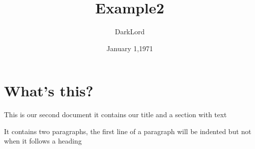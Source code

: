 \documentclass[a4paper,11pt]{article}
\begin{document}
	\title{Example2}
	\author{DarkLord}
	\date{January 1,1971}
	\maketitle
	\section{What's this?}
	This is our second document it contains our title and a section with text
	
	It contains two paragraphs, the first line of a paragraph will be indented but not when it follows a heading
	
\end{document}
